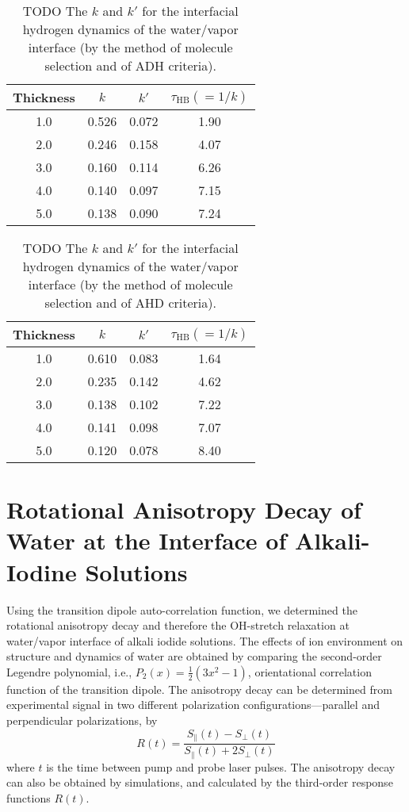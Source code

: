 \begin{table}[H]
\centering
\caption{\label{tab:k_k_prime_tau_128w_pure_ihb_scheme1_ADH} 
    TODO The $k$ and $k'$ for the interfacial hydrogen dynamics of the water/vapor interface (by the method of molecule selection and of ADH criteria).} 
\begin{tabular}{cccc}
 Thickness & $k$ & $k'$ & $\tau_{\text{HB}} (=1/k)$ \\
\hline
  1.0 & 0.526 & 0.072 & 1.90  \\
  2.0 & 0.246 & 0.158 & 4.07  \\
  3.0 & 0.160 & 0.114 & 6.26  \\
  4.0 & 0.140 & 0.097 & 7.15  \\
  5.0 & 0.138 & 0.090 & 7.24  \\
\end{tabular}
\end{table}
\begin{table}[H]
\centering
\caption{\label{tab:k_k_prime_tau_128w_pure_ihb_AHD} 
    TODO The $k$ and $k'$ for the interfacial hydrogen dynamics of the water/vapor interface (by the method of molecule selection and of AHD criteria).} 
\begin{tabular}{cccc}
 Thickness & $k$ & $k'$ & $\tau_{\text{HB}} (=1/k)$ \\
\hline
  1.0 & 0.610 & 0.083 & 1.64  \\
  2.0 & 0.235 & 0.142 & 4.62  \\
  3.0 & 0.138 & 0.102 & 7.22  \\
  4.0 & 0.141 & 0.098 & 7.07  \\
  5.0 & 0.120 & 0.078 & 8.40  \\
\end{tabular}
\end{table}

\section{Rotational Anisotropy Decay of Water at the Interface of Alkali-Iodine Solutions}\label{RAD}
Using the transition dipole auto-correlation function, 
we determined the rotational anisotropy decay and therefore the OH-stretch relaxation at water/vapor interface of alkali iodide solutions.
The effects of ion environment on structure and dynamics of water are obtained by comparing the second-order Legendre polynomial, 
i.e.,  $P_2(x)=\frac{1}{2}(3x^2-1)$,  orientational correlation function of the transition dipole.
The anisotropy decay can be determined from experimental signal in two different polarization configurations---parallel and perpendicular polarizations, by 
\begin{equation}
        R(t)=\frac{S_{\parallel}(t)-S_{\perp}(t)}{S_{\parallel}(t)+2S_{\perp}(t)}
\label{eq:ad}
\end{equation}
where $t$ is the time between pump and probe laser pulses.  The anisotropy decay can also be obtained by simulations, and calculated by the third-order response functions $R(t)$. \cite{Jansen10,Jansen06}
%

